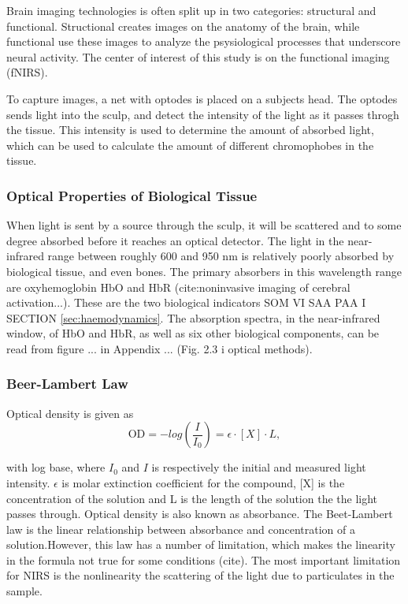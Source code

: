 Brain imaging technologies is often split up in two categories: structural and functional. Structional creates images on the anatomy of the brain, while functional use these images to analyze the psysiological processes that underscore neural activity\cite{Carter20101}. The center of interest of this study is on the functional imaging (fNIRS).

To capture images, a net with optodes is placed on a subjects head. The optodes sends light into the sculp, and detect the intensity of the light as it passes throgh the tissue. This intensity is used to determine the amount of absorbed light, which can be used to calculate the amount of different chromophobes in the tissue.

\subsubsection{Optical Properties of Biological Tissue}
When light is sent by a source through the sculp, it will be scattered and to some degree absorbed before it reaches an optical detector\cite{opticalMethods}. The light in the near-infrared range between roughly 600 and 950 nm is relatively poorly absorbed by biological tissue, and even bones. The primary absorbers in this wavelength range are oxyhemoglobin HbO and HbR (cite:noninvasive imaging of cerebral activation...). These are the two biological indicators SOM VI SAA PAA I SECTION \ref{sec:haemodynamics}. The absorption spectra, in the near-infrared window, of HbO and HbR, as well as six other biological components, can be read from figure ... in Appendix ... (Fig. 2.3 i optical methods). 

\subsubsection{Beer-Lambert Law}
Optical density is given as
\begin{equation}
\text{OD}=-log(\frac{I}{I_0}) = \epsilon \cdot [X] \cdot L,
\end{equation}

with log base, where $I_0$ and $I$ is respectively the initial and measured light intensity. $\epsilon$ is molar extinction coefficient for the compound, [X] is the concentration of the solution and L is the length of the solution the the light passes through. Optical density is also known as absorbance. The Beet-Lambert law is the linear relationship between absorbance and concentration of a solution.However, this law has a number of limitation, which makes the linearity in the formula not true for some conditions (cite). The most important limitation for NIRS is the nonlinearity the scattering of the light due to particulates in the sample.


